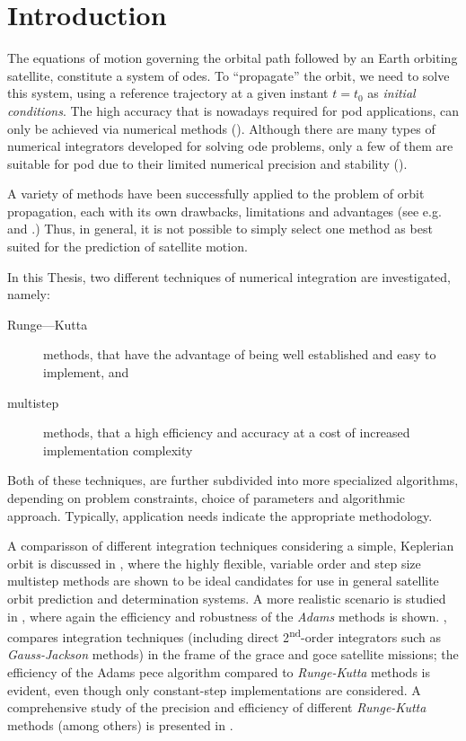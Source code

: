 \section{Introduction}\label{sec:integration-introduction}

The equations of motion governing the orbital path followed by an Earth orbiting 
satellite, constitute a system of \glspl{ode}. To ``propagate'' the orbit, we need 
to solve this system, using a reference trajectory at a given instant $t=t_0$ as 
\emph{initial conditions}. The high accuracy that is nowadays required for \gls{pod} 
applications, can only be achieved via numerical methods (\cite{Montenbruck2000}).
Although there are many types of numerical integrators developed for solving \gls{ode} 
problems, only a few of them are suitable for \gls{pod} due to their limited 
numerical precision and stability (\cite{Yufeng2020}).

A variety of methods have been successfully applied to the problem of orbit 
propagation, each with its own drawbacks, limitations and advantages (see e.g. 
\cite{Somodi2011} and \cite{Atallah2020}.)
Thus, in general, it is not possible to simply select one method as best 
suited for the prediction of satellite motion.

In this Thesis, two different techniques of numerical integration are investigated, 
namely:
\begin{description}
    \item[Runge—Kutta] methods, that have the advantage of being well established 
      and easy to implement, and
    \item[multistep] methods, that a high efficiency and accuracy at a cost of 
      increased implementation complexity
\end{description}
Both of these techniques, are further subdivided into more specialized algorithms, 
depending on problem constraints, choice of parameters and algorithmic approach. 
Typically, application needs indicate the appropriate methodology.

 A comparisson of different integration techniques considering a simple, Keplerian 
orbit is discussed in \cite{Montenbruck1992}, where the highly flexible, variable
order and step size multistep methods are shown to be ideal candidates for use 
in general satellite orbit prediction and determination systems. A more realistic 
scenario is studied in \cite{Somodi2011}, where again the efficiency and robustness 
of the \emph{Adams} methods is shown. 
\cite{Papanikolaou2016}, compares integration techniques (including direct 
2\textsuperscript{nd}-order integrators such as \emph{Gauss-Jackson} methods) 
in the frame of the \gls{grace} and \gls{goce} satellite missions; the efficiency 
of the Adams \gls{pece} algorithm compared to \emph{Runge-Kutta} methods is evident, 
even though only constant-step implementations are considered. A comprehensive 
study of the precision and efficiency of different \emph{Runge-Kutta} methods 
(among others) is presented in \cite{Atallah2020}.

